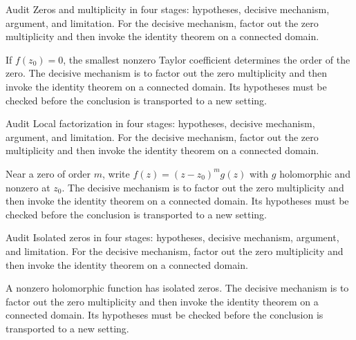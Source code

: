 \begin{problem}\label{prob:iv07-problem-01}
Audit Zeros and multiplicity in four stages: hypotheses, decisive mechanism, argument, and limitation. For the decisive mechanism, factor out the zero multiplicity and then invoke the identity theorem on a connected domain.
\end{problem}
\begin{solution}
If $f(z_0)=0$, the smallest nonzero Taylor coefficient determines the order of the zero. The decisive mechanism is to factor out the zero multiplicity and then invoke the identity theorem on a connected domain. Its hypotheses must be checked before the conclusion is transported to a new setting.
\end{solution}

\begin{problem}\label{prob:iv07-problem-02}
Audit Local factorization in four stages: hypotheses, decisive mechanism, argument, and limitation. For the decisive mechanism, factor out the zero multiplicity and then invoke the identity theorem on a connected domain.
\end{problem}
\begin{solution}
Near a zero of order $m$, write $f(z)=(z-z_0)^mg(z)$ with $g$ holomorphic and nonzero at $z_0$. The decisive mechanism is to factor out the zero multiplicity and then invoke the identity theorem on a connected domain. Its hypotheses must be checked before the conclusion is transported to a new setting.
\end{solution}

\begin{problem}\label{prob:iv07-problem-03}
Audit Isolated zeros in four stages: hypotheses, decisive mechanism, argument, and limitation. For the decisive mechanism, factor out the zero multiplicity and then invoke the identity theorem on a connected domain.
\end{problem}
\begin{solution}
A nonzero holomorphic function has isolated zeros. The decisive mechanism is to factor out the zero multiplicity and then invoke the identity theorem on a connected domain. Its hypotheses must be checked before the conclusion is transported to a new setting.
\end{solution}

